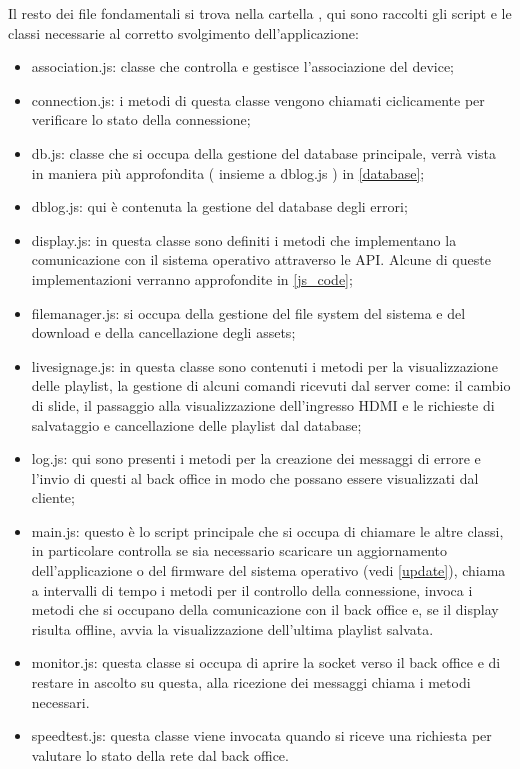 Il resto dei file fondamentali si trova nella cartella , qui sono raccolti gli script e le classi necessarie al corretto svolgimento dell'applicazione:

\begin{itemize}
    \item association.js: classe che controlla e gestisce l'associazione del device;
    \item connection.js: i metodi di questa classe vengono chiamati ciclicamente per verificare lo stato della connessione;
    \item db.js: classe che si occupa della gestione del database principale, verrà vista in maniera più approfondita ( insieme a dblog.js ) in \ref*{database};
    \item dblog.js: qui è contenuta la gestione del database degli errori;
    \item display.js: in questa classe sono definiti i metodi che implementano la comunicazione con il sistema operativo attraverso le API. Alcune di queste implementazioni verranno approfondite in \ref*{js_code};
    \item filemanager.js: si occupa della gestione del file system del sistema e del download e della cancellazione degli assets;
    \item livesignage.js: in questa classe sono contenuti i metodi per la visualizzazione delle playlist, la gestione di alcuni comandi ricevuti dal server come: il cambio di slide, il passaggio alla visualizzazione dell'ingresso HDMI e le richieste di salvataggio e cancellazione delle playlist dal database;
    \item log.js: qui sono presenti i metodi per la creazione dei messaggi di errore e l'invio di questi al back office in modo che possano essere visualizzati dal cliente;
    \item main.js: questo è lo script principale che si occupa di chiamare le altre classi, in particolare controlla se sia necessario scaricare un aggiornamento dell'applicazione o del firmware del sistema operativo (vedi \ref*{update}), chiama a intervalli di tempo i metodi per il controllo della connessione, invoca i metodi che si occupano della comunicazione con il back office e, se il display risulta offline, avvia la visualizzazione dell'ultima playlist salvata.
    \item monitor.js: questa classe si occupa di aprire la socket verso il back office e di restare in ascolto su questa, alla ricezione dei messaggi chiama i metodi necessari.
    \item speedtest.js: questa classe viene invocata quando si riceve una richiesta per valutare lo stato della rete dal back office.
\end{itemize}

